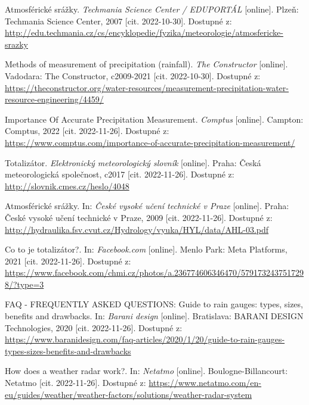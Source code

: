 

\begin{thebibliography}{99}

Atmosférické srážky. \textit{Techmania Science Center / EDUPORTÁL} [online]. Plzeň: Techmania Science Center, 2007 [cit. 2022-10-30]. Dostupné z: \url{http://edu.techmania.cz/cs/encyklopedie/fyzika/meteorologie/atmosfericke-srazky}

Methods of measurement of precipitation (rainfall). \textit{The Constructor} [online]. Vadodara: The Constructor, c2009-2021 [cit. 2022-10-30]. Dostupné z: \url{https://theconstructor.org/water-resources/measurement-precipitation-water-resource-engineering/4459/}

Importance Of Accurate Precipitation Measurement. \textit{Comptus} [online]. Campton: Comptus, 2022 [cit. 2022-11-26]. Dostupné z: \url{https://www.comptus.com/importance-of-accurate-precipitation-measurement/}

Totalizátor. \textit{Elektronický meteorologický slovník} [online]. Praha: Česká meteorologická společnost, c2017 [cit. 2022-11-26]. Dostupné z: \url{http://slovnik.cmes.cz/heslo/4048}

Atmosférické srážky. In: \textit{České vysoké učení technické v Praze} [online]. Praha: České vysoké učení technické v Praze, 2009 [cit. 2022-11-26]. Dostupné z: \url{http://hydraulika.fsv.cvut.cz/Hydrology/vyuka/HYL/data/AHL-03.pdf}

Co to je totalizátor?. In: \textit{Facebook.com} [online]. Menlo Park: Meta Platforms, 2021 [cit. 2022-11-26]. Dostupné z: \url{https://www.facebook.com/chmi.cz/photos/a.236774606346470/5791732437517298/?type=3}

FAQ - FREQUENTLY ASKED QUESTIONS: Guide to rain gauges: types, sizes, benefits and drawbacks. In: \textit{Barani design} [online]. Bratislava: BARANI DESIGN Technologies, 2020 [cit. 2022-11-26]. Dostupné z: \url{https://www.baranidesign.com/faq-articles/2020/1/20/guide-to-rain-gauges-types-sizes-benefits-and-drawbacks}

How does a weather radar work?. In: \textit{Netatmo} [online]. Boulogne-Billancourt: Netatmo [cit. 2022-11-26]. Dostupné z: \url{https://www.netatmo.com/en-eu/guides/weather/weather-factors/solutions/weather-radar-system}


\end{thebibliography}
